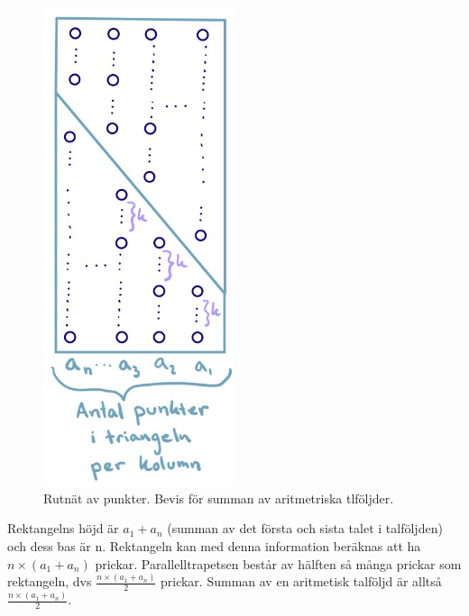 \documentclass[nobib]{tufte-handout}
\begin{document}
\begin{example}
  \begin{figure}[h]
    \centering
    \includegraphics[width=0.5\textwidth]{graphics/86C79F60-B920-4AA3-A6CB-DEA00A8C58A6.jpeg}
    \caption{Rutnät av punkter. Bevis för summan av aritmetriska tlföljder. }
  \end{figure}
  
  Rektangelns höjd är $a_{1}+a_{n}$ (summan av det första och sista talet i talföljden) och dess bas är n. Rektangeln kan med denna information beräknas att ha $n\times(a_{1}+a_{n})$ prickar. Parallelltrapetsen består av hälften så många prickar som rektangeln, dvs $\frac{n\times(a_{1}+a_{n})}{2}$ prickar. Summan av en aritmetisk talföljd är alltså $\frac{n\times(a_{1}+a_{n})}{2}$.  
  
\end{example}
\end{document}
